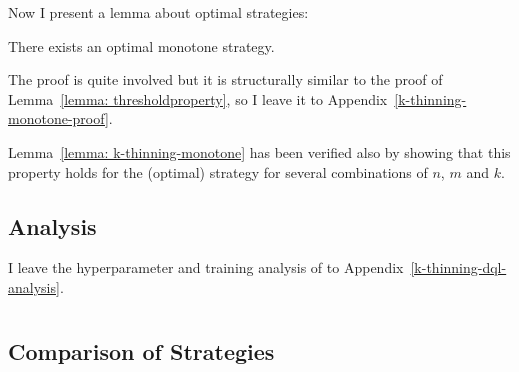 Now I present a lemma about optimal strategies:

\begin{lemma} \label{lemma: k-thinning-monotone}
There exists an optimal monotone strategy.
\end{lemma}



The proof is quite involved but it is structurally similar to the proof of Lemma~\ref{lemma: thresholdproperty}, so I leave it to Appendix~\ref{k-thinning-monotone-proof}.


\begin{remark}
Lemma~\ref{lemma: k-thinning-monotone} has been verified also by showing that this property holds for the (optimal) \DP strategy for several combinations of $n$, $m$ and $k$.
\end{remark}


\subsection{\DQL Analysis} \label{dql-analysis-k-thinning}


I leave the hyperparameter and training analysis of \DQL to Appendix~\ref{k-thinning-dql-analysis}.

\section{\GraphicalTwoChoice}


\subsection{Comparison of Strategies} \label{graphical-two-choice-comparison}


